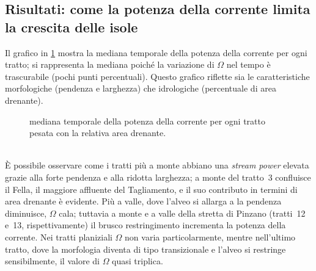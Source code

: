 \subsection{Risultati: come la potenza della corrente limita la crescita delle isole}
Il grafico in \cref{graph:omega-perc-50} mostra la mediana temporale della potenza della corrente per ogni tratto; si rappresenta la mediana poiché la variazione di $\Omega$ nel tempo è trascurabile (pochi punti percentuali).
Questo grafico riflette sia le caratteristiche morfologiche (pendenza e larghezza) che idrologiche (percentuale di area drenante).
%
\begin{figure}
	\centering
	
	\caption[potenza della corrente in ogni tratto]{mediana temporale della potenza della corrente per ogni tratto pesata con la relativa area drenante.}
	\label{graph:omega-perc-50}
\end{figure}
%
\\
È possibile osservare come i tratti più a monte abbiano una \emph{stream power} elevata grazie alla forte pendenza e alla ridotta larghezza; a monte del tratto~3 confluisce il Fella, il maggiore affluente del Tagliamento, e il suo contributo in termini di area drenante è evidente.
Più a valle, dove l'alveo si allarga a la pendenza diminuisce, $\Omega$ cala; tuttavia a monte e a valle della stretta di Pinzano (tratti~12 e~13, rispettivamente) il brusco restringimento incrementa la potenza della corrente.
Nei tratti planiziali $\Omega$ non varia particolarmente, mentre nell'ultimo tratto, dove la morfologia diventa di tipo transizionale e l'alveo si restringe sensibilmente, il valore di $\Omega$ quasi triplica.

